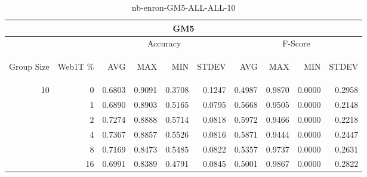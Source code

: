 \begin{center}
\begin{table}[htbp]
\begin{tabular}{ | r | r | r | r | r | r | r | r | r | r |}
\hline
\multicolumn{10}{|c|}{GM5}\\
\hline
 & & \multicolumn{4}{|c|}{Accuracy} & \multicolumn{4}{|c|}{F-Score}\\ \cline{3-10}
\begin{sideways}Group Size\end{sideways} & \begin{sideways}Web1T \%\end{sideways} & \begin{sideways}AVG\end{sideways} & \begin{sideways}MAX\end{sideways} & \begin{sideways}MIN\end{sideways} & \begin{sideways}STDEV\end{sideways} & \begin{sideways}AVG\end{sideways} & \begin{sideways}MAX\end{sideways} & \begin{sideways}MIN\end{sideways} & \begin{sideways}STDEV\end{sideways}\\
\hline
\multirow{5}{*}{10}
 & 0 & 0.6803 & 0.9091 & 0.3708 & 0.1247 & 0.4987 & 0.9870 & 0.0000 & 0.2958\\ \cline{2-10}
 & 1 & 0.6890 & 0.8903 & 0.5165 & 0.0795 & 0.5668 & 0.9505 & 0.0000 & 0.2148\\ \cline{2-10}
 & 2 & 0.7274 & 0.8888 & 0.5714 & 0.0818 & 0.5972 & 0.9466 & 0.0000 & 0.2218\\ \cline{2-10}
 & 4 & 0.7367 & 0.8857 & 0.5526 & 0.0816 & 0.5871 & 0.9444 & 0.0000 & 0.2447\\ \cline{2-10}
 & 8 & 0.7169 & 0.8473 & 0.5485 & 0.0822 & 0.5357 & 0.9737 & 0.0000 & 0.2631\\ \cline{2-10}
 & 16 & 0.6991 & 0.8389 & 0.4791 & 0.0845 & 0.5001 & 0.9867 & 0.0000 & 0.2822\\ \cline{2-10}
\hline
\end{tabular}
\caption{nb-enron-GM5-ALL-ALL-10}
\label{table:nb-enron-GM5-ALL-ALL-10}
\end{table}
\end{center}

